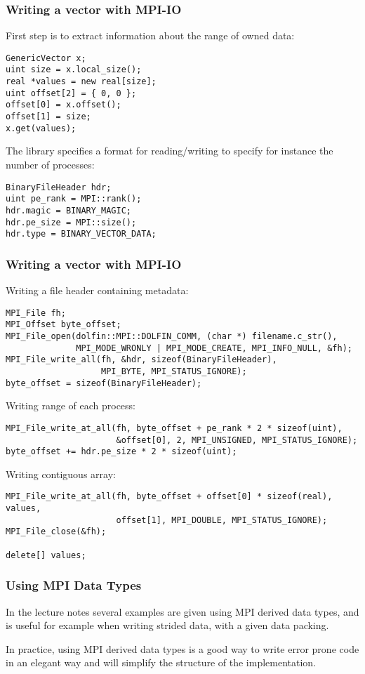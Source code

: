 \begin{frame}[fragile]
\frametitle{Writing a vector with MPI-IO}
First step is to extract information about the range of owned data:
{\small
\begin{lstlisting}[style=c]
GenericVector x;
uint size = x.local_size();
real *values = new real[size];
uint offset[2] = { 0, 0 };
offset[0] = x.offset();
offset[1] = size;
x.get(values);
\end{lstlisting}
}

The library specifies a format for reading/writing to specify for instance the number of processes:
{\small
\begin{lstlisting}[style=c]
BinaryFileHeader hdr;
uint pe_rank = MPI::rank();
hdr.magic = BINARY_MAGIC;
hdr.pe_size = MPI::size();
hdr.type = BINARY_VECTOR_DATA;
\end{lstlisting}
}

\end{frame}

\begin{frame}[fragile]
\frametitle{Writing a vector with MPI-IO}

Writing a file header containing metadata:
{\scriptsize
\begin{lstlisting}[style=c]
MPI_File fh;
MPI_Offset byte_offset;
MPI_File_open(dolfin::MPI::DOLFIN_COMM, (char *) filename.c_str(),
              MPI_MODE_WRONLY | MPI_MODE_CREATE, MPI_INFO_NULL, &fh);
MPI_File_write_all(fh, &hdr, sizeof(BinaryFileHeader),
                   MPI_BYTE, MPI_STATUS_IGNORE);
byte_offset = sizeof(BinaryFileHeader);
\end{lstlisting}
}

Writing range of each process:
{\scriptsize
\begin{lstlisting}[style=c]
MPI_File_write_at_all(fh, byte_offset + pe_rank * 2 * sizeof(uint),
                      &offset[0], 2, MPI_UNSIGNED, MPI_STATUS_IGNORE);
byte_offset += hdr.pe_size * 2 * sizeof(uint);
\end{lstlisting}
}

Writing contiguous array:
{\scriptsize
\begin{lstlisting}[style=c]
MPI_File_write_at_all(fh, byte_offset + offset[0] * sizeof(real), values,
                      offset[1], MPI_DOUBLE, MPI_STATUS_IGNORE);
MPI_File_close(&fh);

delete[] values;
\end{lstlisting}
}

\end{frame}

\begin{frame}[fragile]
\frametitle{Using MPI Data Types}

In the lecture notes several examples are given using MPI derived data types, and is useful for example when writing strided data, with a given data packing.

\medskip
In practice, using MPI derived data types is a good way to write error prone code in an elegant way and will simplify the structure of the implementation.


\end{frame}


